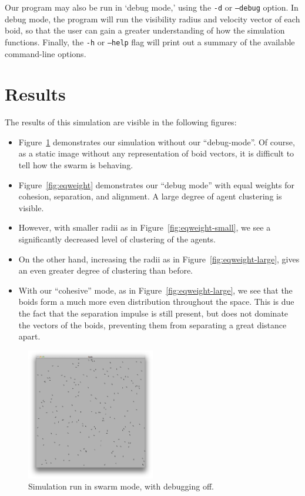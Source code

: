 Our program may also be run in `debug mode,' using the \texttt{-d} or \texttt{--debug} option. In debug mode, the program will run the visibility radius and velocity vector of each boid, so that the user can gain a greater understanding of how the simulation functions. Finally, the \texttt{-h} or \texttt{--help} flag will print out a summary of the available command-line options.

\section{Results}
    
    The results of this simulation are visible in the following figures:
    \begin{itemize}
        \item Figure~\ref{fig:no-debug} demonstrates our simulation without our ``debug-mode''. Of course, as a static image without any representation of boid vectors, it is difficult to tell how the swarm is behaving.
        \item Figure~\ref{fig:eqweight} demonstrates our ``debug mode'' with equal weights for cohesion, separation, and alignment. A large degree of agent clustering is visible.
        \item However, with smaller radii as in Figure~\ref{fig:eqweight-small}, we see a significantly decreased level of clustering of the agents.
        \item On the other hand, increasing the radii as in Figure~\ref{fig:eqweight-large}, gives an even greater degree of clustering than before.
        \item With our ``cohesive'' mode, as in Figure~\ref{fig:eqweight-large}, we see that the boids form a much more even distribution throughout the space. This is due the fact that the separation impulse is still present, but does not dominate the vectors of the boids, preventing them from separating a great distance apart.
    \end{itemize}
    
    \begin{figure}
        \centering
        \includegraphics[width=0.5\textwidth]{assets/img/nodebug}
        \caption{Simulation run in swarm mode, with debugging off.}
        \label{fig:no-debug}
    \end{figure}
    
